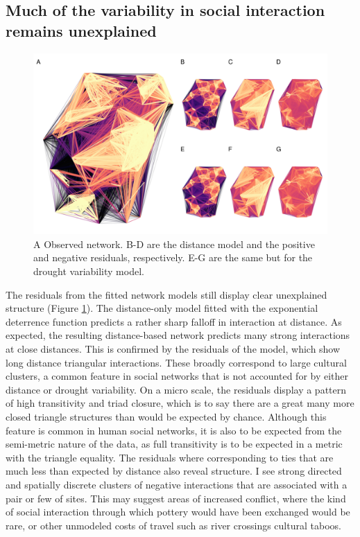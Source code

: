 \documentclass[fleqn,10pt]{wlscirep}
\begin{document}
\subsection*{Much of the variability in social interaction remains unexplained}

\begin{figure}[!htbp]
\centering
\includegraphics[width=.8\linewidth]{figures/null_model.png}
\caption{A Observed network. B-D are the distance model and the positive and negative residuals, respectively. E-G are the same but for the drought variability model.}
\label{fig:residuals}
\end{figure}

The residuals from the fitted network models still display clear unexplained structure (Figure \ref{fig:residuals}). The distance-only model fitted with the exponential deterrence function predicts a rather sharp falloff in interaction at distance. As expected, the resulting distance-based network predicts many strong interactions at close distances. This is confirmed by the residuals of the model, which show long distance triangular interactions. These broadly correspond to large cultural clusters, a common feature in social networks that is not accounted for by either distance or drought variability. On a micro scale, the residuals display a pattern of high transitivity and triad closure, which is to say there are a great many more closed triangle structures than would be expected by chance. Although this feature is common in human social networks, it is also to be expected from the semi-metric nature of the data, as full transitivity is to be expected in a metric with the triangle equality. The residuals where corresponding to ties that are much less than expected by distance also reveal structure. I see strong directed and spatially discrete clusters of negative interactions that are associated with a pair or few of sites. This may suggest areas of increased conflict, where the kind of social interaction through which pottery would have been exchanged would be rare, or other unmodeled costs of travel such as river crossings cultural taboos. 
\end{document}
